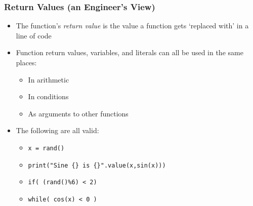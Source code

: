 \documentclass[english,14pt]{beamer}
\begin{document}
\begin{frame}
\frametitle{Return Values (an Engineer's View)}
\begin{itemize}
\item The function's \textit{return value} is the value a function gets `replaced with' in a line of code
 
\item Function return values, variables, and literals can all be used in the same places:
	\begin{itemize}
		\item In arithmetic
		\item In conditions
		\item As arguments to other functions
	\end{itemize}	 
 
\item The following are all valid:
	\begin{itemize}
		\item \texttt{x = rand()}
		\item \texttt{print("Sine \{\} is \{\}".value(x,sin(x)))}
		\item \texttt{if( (rand()\%6) < 2)}
		\item \texttt{while( cos(x) < 0 )}
	\end{itemize}
\end{itemize}
\end{frame}
\end{document}

